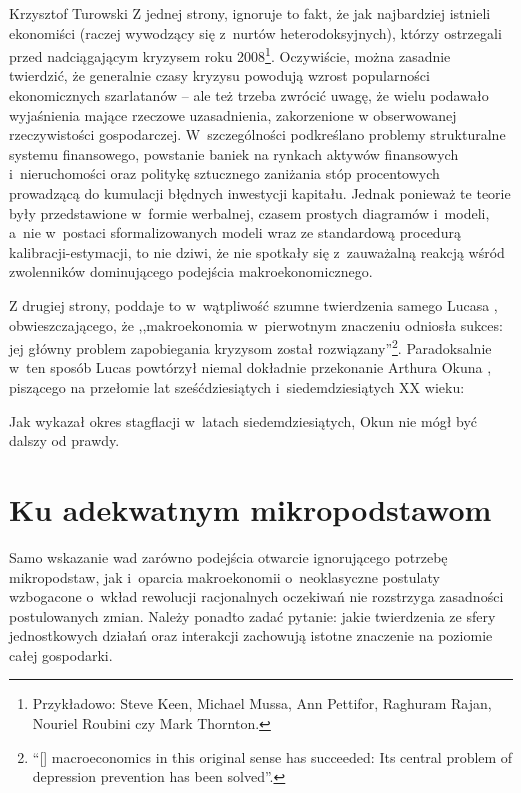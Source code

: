 \begin{artplenv}{Krzysztof Turowski}
Z jednej strony, ignoruje to fakt, że jak najbardziej istnieli ekonomiści (raczej wywodzący się z~nurtów
heterodoksyjnych), którzy ostrzegali przed nadciągającym kryzysem roku 2008\footnote{Przykładowo: Steve Keen, Michael
Mussa, Ann Pettifor, Raghuram Rajan, Nouriel Roubini czy Mark Thornton.}. Oczywiście, można zasadnie twierdzić, że
generalnie czasy kryzysu powodują wzrost popularności ekonomicznych szarlatanów
\parencite{robinson_second_1972}
 --  ale też trzeba zwrócić uwagę, że wielu podawało wyjaśnienia mające rzeczowe uzasadnienia, zakorzenione
w obserwowanej rzeczywistości gospodarczej. W~szczególności podkreślano problemy strukturalne systemu finansowego,
powstanie baniek na rynkach aktywów finansowych i~nieruchomości oraz politykę sztucznego zaniżania stóp procentowych
prowadzącą do kumulacji błędnych inwestycji kapitału. Jednak ponieważ te teorie były przedstawione w~formie werbalnej,
czasem prostych diagramów i~modeli, a~nie w~postaci sformalizowanych modeli wraz ze standardową procedurą
kalibracji-estymacji, to nie dziwi, że nie spotkały się z~zauważalną reakcją wśród zwolenników dominującego podejścia
makroekonomicznego.

Z drugiej strony, poddaje to w~wątpliwość szumne twierdzenia samego Lucasa
\parencite[s.~1]{lucas_macroeconomic_2003},
obwieszczającego, że ,,makroekonomia w~pierwotnym znaczeniu odniosła sukces: jej główny problem zapobiegania kryzysom
został rozwiązany''\footnote{``[\mydots] macroeconomics in this original sense has succeeded: Its central problem of depression
prevention has been solved''.}. Paradoksalnie w~ten sposób Lucas powtórzył niemal dokładnie przekonanie Arthura Okuna
\parencite*{okun_political_1970},
piszącego na przełomie lat sześćdziesiątych i~siedemdziesiątych XX wieku:


Jak wykazał okres stagflacji w~latach siedemdziesiątych, Okun nie mógł być dalszy od prawdy.

\section{Ku adekwatnym mikropodstawom}
Samo wskazanie wad zarówno podejścia otwarcie ignorującego potrzebę mikropodstaw, jak i~oparcia
makroekonomii o~neoklasyczne postulaty wzbogacone o~wkład rewolucji racjonalnych oczekiwań nie rozstrzyga zasadności postulowanych
zmian. Należy ponadto zadać pytanie: jakie twierdzenia ze sfery jednostkowych działań oraz interakcji zachowują istotne
znaczenie na poziomie całej gospodarki.


\end{artplenv}
